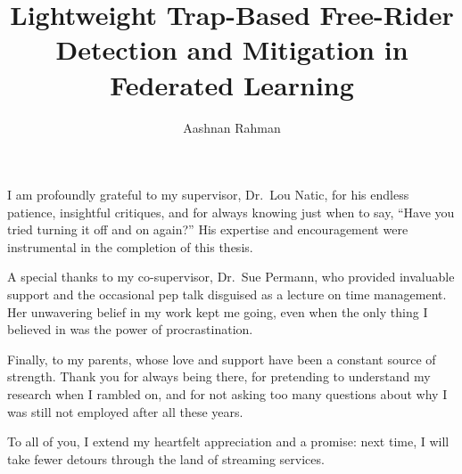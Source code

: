 \documentclass{iutmscthesis}
\title{Lightweight Trap-Based Free-Rider Detection and Mitigation in Federated Learning}
\author{Aashnan Rahman}{231041006}
\begin{document}

\coverpage


\titlepage

\certificateofapproval
\declarationofcandidate


\tableofcontents
\listoffigures
\listoftables

\clearpage

\begin{abbreviations}
\end{abbreviations}

\begin{acknowledgement}

I am profoundly grateful to my supervisor, Dr.\ Lou Natic, for his endless patience, insightful critiques, and for always knowing just when to say, ``Have you tried turning it off and on again?'' His expertise and encouragement were instrumental in the completion of this thesis.

A special thanks to my co-supervisor, Dr.\ Sue Permann, who provided invaluable support and the occasional pep talk disguised as a lecture on time management. Her unwavering belief in my work kept me going, even when the only thing I believed in was the power of procrastination.

Finally, to my parents, whose love and support have been a constant source of strength. Thank you for always being there, for pretending to understand my research when I rambled on, and for not asking too many questions about why I was still not employed after all these years.

To all of you, I extend my heartfelt appreciation and a promise: next time, I will take fewer detours through the land of streaming services.
\end{acknowledgement}
\end{document}
